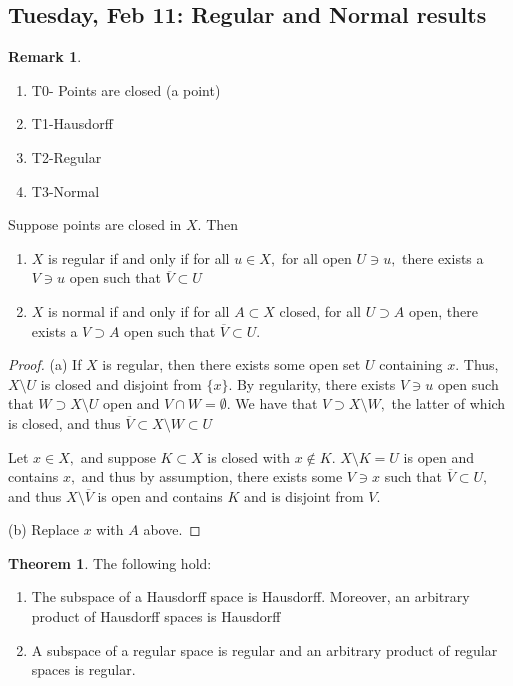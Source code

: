 \documentclass[10pt, oneside]{article}
\theoremstyle{definition}
\newtheorem{thm}{Theorem}
\newtheorem{rem}{Remark}
\begin{document}
\subsection*{Tuesday, Feb 11: Regular and Normal results}
\begin{rem}
    \begin{enumerate}
        \item T0- Points are closed (a  point)
        \item T1-Hausdorff
        \item T2-Regular
        \item T3-Normal
    \end{enumerate}
\end{rem}
\begin{lemma}
    Suppose points are closed in $X.$ Then 
    \begin{enumerate}
        \item $X$ is regular if and only if for all $u\in X,$ for all open $U\ni u,$ there exists a $V\ni u$ open such that $\overline{V} \subset U$ 
        \item $X$ is normal if and only if for all $A\subset X$ closed, for all $U\supset A$ open, there exists a $V\supset A$ open such that $\overline{V}\subset U.$
    \end{enumerate}
\end{lemma}
\begin{proof}
    (a) If $X$ is regular, then there exists some open set $U$ containing $x.$ Thus, $X\setminus U$ is closed and disjoint from $\{x\}.$ By  regularity, there exists $V\ni u$ open such that $W \supset X\setminus U$ open and $V\cap W = \emptyset.$ We have that $V \supset X\setminus W,$ the latter of which is closed, and thus $\overline{V}\subset X\setminus W \subset U$

    Let $x\in X,$ and suppose $K\subset X$ is closed with $x\notin K.$ $X\setminus K = U$ is open and contains $x,$ and thus by assumption, there exists some $V\ni x$ such that $\overline{V} \subset U,$ and thus $X\setminus \overline{V}$ is open and contains $K$ and is disjoint from $V.$ 

    (b) Replace $x$ with $A$ above.
\end{proof}
\begin{thm}
    The following hold:
    \begin{enumerate}
        \item The subspace of a Hausdorff space is Hausdorff. Moreover, an arbitrary product of Hausdorff spaces is Hausdorff
        \item A subspace of a regular space is regular and an arbitrary product of regular spaces is regular.
    \end{enumerate}
\end{thm}
\end{document}
